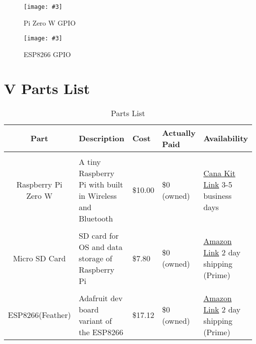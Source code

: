 \documentclass[12pt]{article}
\newcommand{\nimg}[4][width=\textwidth]{
    \begin{figure}[H]
        \centering
        \texttt{[image: \#3]}
        \caption{#4}
        \label{#2}
    \end{figure}
}
\begin{document}
    \nimg [height = 3.75 in]{Risk}{pics/Pi_Zero_pinout.png}{Pi Zero W GPIO}

    \nimg [height = 3.75 in]{Risk}{pics/feather.png}{ESP8266 GPIO}

\section{V Parts List}
\begin{table}[H]
    \centering
    \caption{Parts List}
    \label{tab:specs4}
    \begin{tabularx}{\linewidth}{cXXXX} \toprule
        Part & Description & Cost & Actually Paid & Availability\\ \midrule
        \\Raspberry Pi Zero W & A tiny Raspberry Pi with built in Wireless and Bluetooth& \$10.00 & \$0 (owned) & \href{https://www.canakit.com/raspberry-pi-zero-wireless.html?src=raspberrypi}{Cana Kit Link} 3-5 business days\\
        \\Micro SD Card & SD card for OS and data storage of Raspberry Pi& \$7.80 & \$0 (owned) & \href{https://www.amazon.com/SanDisk-Mobile-MicroSDHC-Memory-SDSDQM-B35A/dp/B004ZIENBA/ref=sr\_1\_5?ie=UTF8\&qid=1510058599\&sr=8-5\&keywords=micro+sd+card+8gb\&dpID=41hGPOLym4L\&preST=\_SX300\_QL70\_\&dpSrc=srch}{Amazon Link} 2 day shipping (Prime)\\
        \\ESP8266(Feather) & Adafruit dev board variant of the ESP8266 & \$17.12 & \$0 (owned) & \href{https://www.amazon.com/Adafruit-2821-Feather-HUZZAH-ESP8266/dp/B019MGW6N6/ref=sr\_1\_1\_sspa?ie=UTF8\&qid=1510058499\&sr=8-1-spons\&keywords=adafruit+feather\&psc=1}{Amazon Link} 2 day shipping (Prime)\\
    \end{tabularx}
\end{table}

\end{document}
